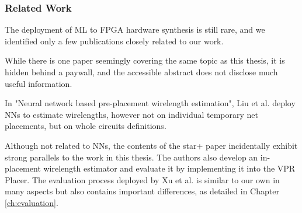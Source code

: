 \subsubsection{Related Work}

The deployment of \gls{ML} to \gls{FPGA} hardware synthesis is still rare\cite{routability-estimator}, and we identified only a few publications closely related to our work. 

While there is one paper seemingly covering the same topic as this thesis, it is hidden behind a paywall, and the accessible abstract does not disclose much useful information\cite{doi:10.1142/S0218213098000202}.

In "Neural network based pre-placement wirelength estimation"\cite{pre-placement-estimation}, Liu et al. deploy \glspl{NN} to estimate wirelengths, however not on individual temporary net placements, but on whole circuits definitions.

Although not related to \glspl{NN}, the contents of the star+ paper incidentally exhibit strong parallels to the work in this thesis. The authors also develop an in-placement wirelength estimator and evaluate it by implementing it into the \gls{VPR} Placer. The evaluation process deployed by Xu et al. is similar to our own in many aspects but also contains important differences, as detailed in Chapter \ref{ch:evaluation}.

